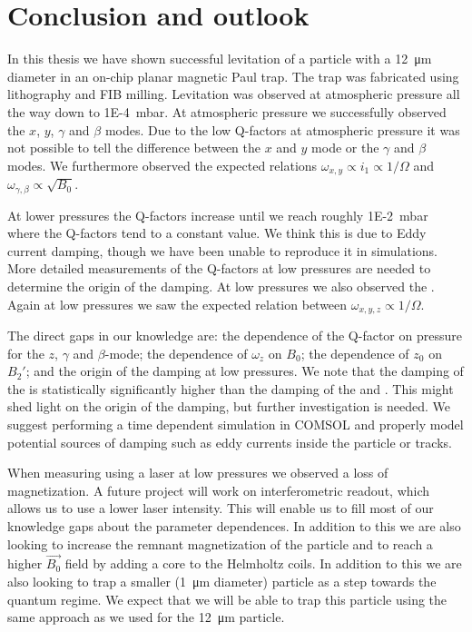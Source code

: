 \chapter{Conclusion and outlook}
\label{chap:conclusion}
In this thesis we have shown successful levitation of a  particle with a \qty{12}{\micro\meter} diameter in an on-chip planar magnetic Paul trap. The trap was fabricated using lithography and FIB milling. Levitation was observed at atmospheric pressure all the way down to \qty{1E-4}{\milli\bar}. At atmospheric pressure we successfully observed the $x$, $y$, $\gamma$ and $\beta$ modes. Due to the low Q-factors at atmospheric pressure it was not possible to tell the difference between the $x$ and $y$ mode or the $\gamma$ and $\beta$ modes. We furthermore observed the expected relations $\omega_{x,y} \propto i_1 \propto 1/\Omega$ and $\omega_{\gamma,\beta} \propto \sqrt{B_0}$.

At lower pressures the Q-factors increase until we reach roughly \qty{1E-2}{\milli\bar} where the Q-factors tend to a constant value. We think this is due to Eddy current damping, though we have been unable to reproduce it in simulations. More detailed measurements of the Q-factors at low pressures are needed to determine the origin of the damping. At low pressures we also observed the \zmode. Again at low pressures we saw the expected relation between $\omega_{x,y,z} \propto 1/\Omega$.

The direct gaps in our knowledge are: the dependence of the Q-factor on pressure for the $z$, $\gamma$ and $\beta$-mode; the dependence of $\omega_z$ on $B_0$; the dependence of $z_0$ on $B_2'$; and the origin of the damping at low pressures. We note that the damping of the \zmode is statistically significantly higher than the damping of the \xmode and \ymode. This might shed light on the origin of the damping, but further investigation is needed. We suggest performing a time dependent simulation in COMSOL and properly model potential sources of damping such as eddy currents inside the particle or tracks.

When measuring using a laser at low pressures we observed a loss of magnetization. A future project will work on interferometric readout, which allows us to use a lower laser intensity. This will enable us to fill most of our knowledge gaps about the parameter dependences. In addition to this we are also looking to increase the remnant magnetization of the particle and to reach a higher $\vec{B_0}$ field by adding a core to the Helmholtz coils. In addition to this we are also looking to trap a smaller (\qty{1}{\micro\meter} diameter) particle as a step towards the quantum regime. We expect that we will be able to trap this particle using the same approach as we used for the \qty{12}{\micro\meter} particle.

